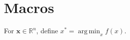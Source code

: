 \documentclass{article}
\newcommand{\R}{\mathbb{R}}
\newcommand{\vect}[1]{\mathbf{#1}}
\DeclareMathOperator*{\argmin}{arg\,min}
\begin{document}
\section{Macros}
For $\vect{x}\in\R^n$, define $x^*=\argmin_x f(x)$.
\end{document}
